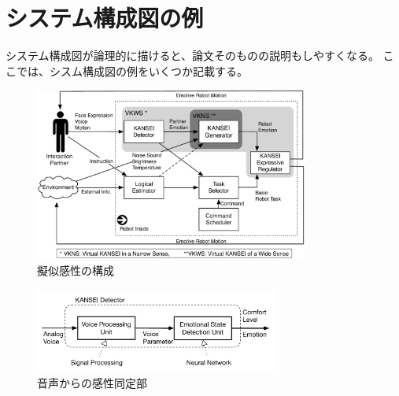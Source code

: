 \documentclass[a4paper,10pt,twocolumn]{jsarticle}
\begin{document}
\section{システム構成図の例}
システム構成図が論理的に描けると、論文そのものの説明もしやすくなる。
ここでは、シスム構成図の例をいくつか記載する。
\begin{figure}[t]
  \centering
  \includegraphics[width=9cm]{VKall.pdf}
  \vspace{-7mm}
  \caption{擬似感性の構成}
  \label{fig:vkall}
  \vspace{5mm}
\end{figure}

\begin{figure}[t]
  \centering
  \includegraphics[width=8cm]{VoiceKANSEIDetector.pdf}
  \vspace{-7mm}
  \caption{音声からの感性同定部}
  \label{fig:VoiceKANSEIDetector}
  \vspace{5mm}
\end{figure}

%
\end{document}
